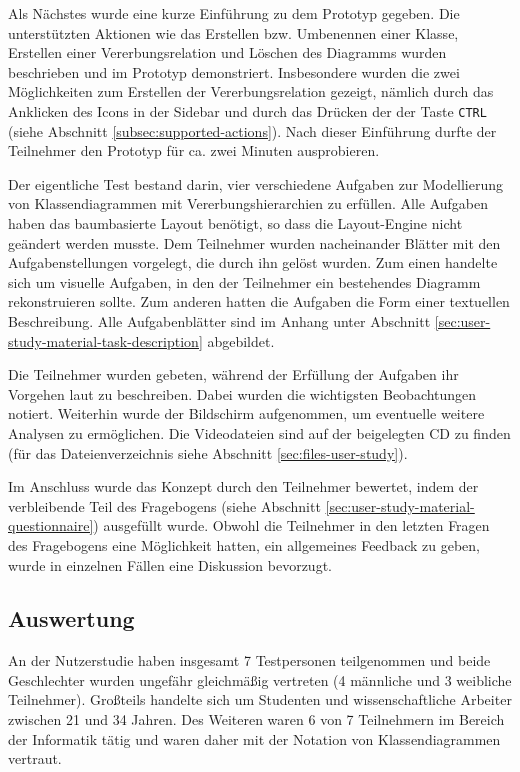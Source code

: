 Als Nächstes wurde eine kurze Einführung zu dem Prototyp gegeben. Die unterstützten Aktionen wie das Erstellen bzw. Umbenennen einer Klasse, Erstellen einer Vererbungsrelation und Löschen des Diagramms wurden beschrieben und im Prototyp demonstriert. Insbesondere wurden die zwei Möglichkeiten zum Erstellen der Vererbungsrelation gezeigt, nämlich durch das Anklicken des Icons in der Sidebar und durch das Drücken der der Taste \texttt{CTRL} (siehe Abschnitt \ref{subsec:supported-actions}). Nach dieser Einführung durfte der Teilnehmer den Prototyp für ca. zwei Minuten ausprobieren.

Der eigentliche Test bestand darin, vier verschiedene Aufgaben zur Modellierung von Klassendiagrammen mit Vererbungshierarchien zu erfüllen. Alle Aufgaben haben das baumbasierte Layout benötigt, so dass die Lay\-out-Engine nicht geändert werden musste. Dem Teilnehmer wurden nacheinander Blätter mit den Aufgabenstellungen vorgelegt, die durch ihn gelöst wurden. Zum einen handelte sich um visuelle Aufgaben, in den der Teilnehmer ein bestehendes Diagramm rekonstruieren sollte. Zum anderen hatten die Aufgaben die Form einer textuellen Beschreibung. Alle Aufgabenblätter sind im Anhang unter Abschnitt \ref{sec:user-study-material-task-description} abgebildet.

Die Teilnehmer wurden gebeten, während der Erfüllung der Aufgaben ihr Vorgehen laut zu beschreiben. Dabei wurden die wichtigsten Beobachtungen notiert. Weiterhin wurde der Bildschirm aufgenommen, um eventuelle weitere Analysen zu ermöglichen. Die Videodateien sind auf der beigelegten CD zu finden (für das Dateienverzeichnis siehe Abschnitt \ref{sec:files-user-study}).

Im Anschluss wurde das Konzept durch den Teilnehmer bewertet, indem der verbleibende Teil des Fragebogens (siehe Abschnitt \ref{sec:user-study-material-questionnaire}) ausgefüllt wurde. Obwohl die Teilnehmer in den letzten Fragen des Fragebogens eine Möglichkeit hatten, ein allgemeines Feedback zu geben, wurde in einzelnen Fällen eine Diskussion bevorzugt.

\subsection{Auswertung}
\label{subsec:user-study-evaluation}

An der Nutzerstudie haben insgesamt 7 Testpersonen teilgenommen und beide Geschlechter wurden ungefähr gleichmäßig vertreten (4 männliche und 3 weibliche Teilnehmer). Großteils handelte sich um Studenten und wissenschaftliche Arbeiter zwischen 21 und 34 Jahren. Des Weiteren waren 6 von 7 Teilnehmern im Bereich der Informatik tätig und waren daher mit der Notation von Klassendiagrammen vertraut.

